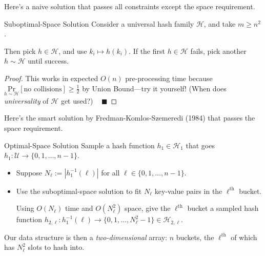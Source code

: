 Here's a naive solution that passes all constraints except the space requirement.

\begin{solution}{Suboptimal-Space Solution}
    Consider a universal hash family $\mathcal{H}$, and take $m \geq n^2$.

    Then pick $h \in \mathcal{H}$, and use $k_i \mapsto h(k_i)$.  If the first $h \in \mathcal{H}$ fails, pick another $h \sim \mathcal{H}$ until success.
\end{solution}

\begin{proof}
    This works in expected $O(n)$ pre-processing time because $\underset{h \sim \mathcal{H}}{\mathrm{Pr}}[\text{no collisions}] \geq \frac{1}{2}$ by Union Bound---try it yourself!  (When does \emph{universality} of $\mathcal{H}$ get used?) ~ $\blacksquare$
\end{proof}

Here's the smart solution by Fredman-Komlos-Szemeredi (1984) that passes the space requirement.

\begin{solution}{Optimal-Space Solution}
    Sample a hash function $h_1 \in \mathcal{H}_1$ that goes $h_1: \mathcal{U} \to \{0, 1, \dots, n - 1\}$.
    \begin{itemize}
        \item Suppose $N_{\ell} := |h_1^{-1}(\ell)|$ for all $\ell \in \{0, 1, \dots, n - 1\}$.
        \item Use the suboptimal-space solution to fit $N_{\ell}$ key-value pairs in the $\ell^{\text{th}}$ bucket.
        
        Using $O(N_{\ell})$ time and $O(N_{\ell}^2)$ space, give the $\ell^{\text{th}}$ bucket a sampled hash function $h_{2, \ell}: h_1^{-1}(\ell) \to \{0, 1, \dots, N_{\ell}^2 - 1\} \in \mathcal{H}_{2, \ell}$.
    \end{itemize}
    Our data structure is then a \emph{two-dimensional} array: $n$ buckets, the $\ell^{\text{th}}$ of which has $N_{\ell}^2$ slots to hash into.
\end{solution}

